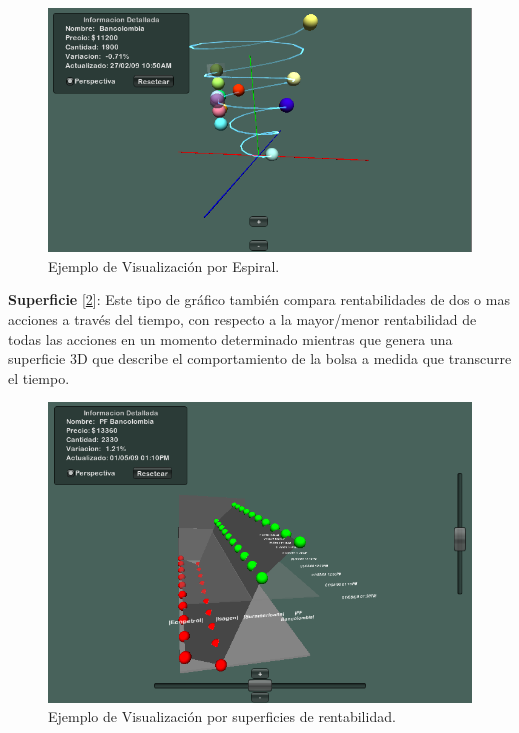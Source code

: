 \begin{figure}[h]
	\centering
		\includegraphics[scale=0.5]{Espiral.png}
		\caption{Ejemplo de Visualización por Espiral.}
	\label{fig:Espiral}
\end{figure}


\textbf{Superficie} [\ref{fig:Superficie}]: Este tipo de gráfico también compara rentabilidades de dos o mas acciones a través del tiempo, con respecto a la mayor/menor rentabilidad de todas las acciones en un momento determinado  mientras que genera una superficie 3D que describe el comportamiento de la bolsa a medida que transcurre el tiempo.\\

\begin{figure}[h]
	\centering
		\includegraphics[scale=0.5]{Superficie.png}
		\caption{Ejemplo de Visualización por superficies de rentabilidad.}
	\label{fig:Superficie}
\end{figure}

